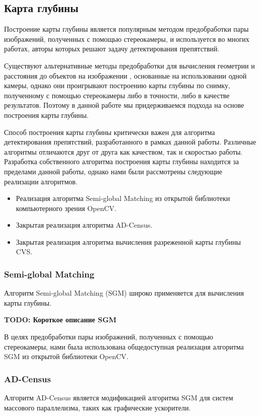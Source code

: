 \documentclass[aps,%
14pt,%
final,%
oneside,
onecolumn,%
musixtex, %
superscriptaddress,%
centertags]{extarticle} %
\begin{document}
\subsection{Карта глубины}

Построение карты глубины является популярным методом предобработки пары изображений, полученных с помощью стереокамеры, и используется во многих работах, авторы которых решают задачу детектирования препятствий.

Существуют альтернативные методы предобработки для вычисления геометрии и расстояния до объектов на изображении \cite{monodepth17}\cite{koenderink1991affine}, основанные на использовании одной камеры, однако они проигрывают построению карты глубины по снимку, полученному с помощью стереокамеры либо в точности, либо в качестве результатов. Поэтому в данной работе мы придерживаемся подхода на основе построения карты глубины.

Способ построения карты глубины критически важен для алгоритма детектирования препятствий, разработанного в рамках данной работы. Различные алгоритмы отличаются друг от друга как качеством, так и скоростью работы. Разработка собственного алгоритма построения карты глубины находится за пределами данной работы, однако нами были рассмотрены следующие реализации алгоритмов.
\begin{itemize}
\item Реализация алгоритма Semi-global Matching из открытой библиотеки компьютерного зрения OpenCV\cite{itseez2015opencv}.
\item Закрытая реализация алгоритма AD-Census.
\item Закрытая реализация алгоритма вычисления разреженной карты глубины CVS.
\end{itemize}

\subsubsection{Semi-global Matching}
Алгоритм Semi-global Matching \cite{hirschmuller2005accurate} (SGM) широко применяется для вычисления карты глубины.

\textbf{\Large TODO: Короткое описание SGM}

В целях предобработки пары изображений, полученных с помощью стереокамеры, нами была использована общедоступная реализация алгоритма SGM из открытой библиотеки OpenCV.

\subsubsection{AD-Census}
Алгоритм AD-Census \cite{mei2011building} является модификацией алгоритма SGM для систем массового параллелизма, таких как графические ускорители.
\end{document}
